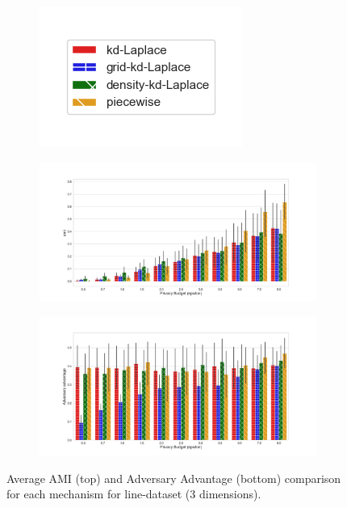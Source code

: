 \begin{figure}[H]
  \centering
  \begin{subfigure}{0.30\textwidth}
    \includegraphics[width=\textwidth]{Results/kd-laplace/ami_bar_comparison_legend.png}
  \end{subfigure}
  \begin{subfigure}{1\textwidth}
    \includegraphics[width=1\textwidth]{Results/kd-laplace/ami_line-dataset_comparison.png}
  \end{subfigure}
  \begin{subfigure}{1\textwidth}
    \includegraphics[width=1\textwidth]{Results/kd-laplace/shokri_mi_adv_line-dataset_comparison.png}
  \end{subfigure}
  \caption{Average AMI (top) and Adversary Advantage (bottom) comparison for each mechanism for line-dataset (3 dimensions).}
  \label{fig:utility_line-dataset_comparison_nd_plot}
\end{figure}
\newpage



